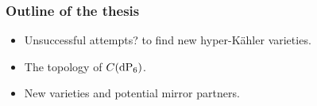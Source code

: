 \begin{frame}
\frametitle{Outline of the thesis}

\begin{itemize}
	\item Unsuccessful attempt\alert{s?} to find new hyper-Kähler varieties.
	\item The topology of $C(\dP6)$.
	\item New \CY varieties and potential mirror partners.
\end{itemize}

\end{frame}